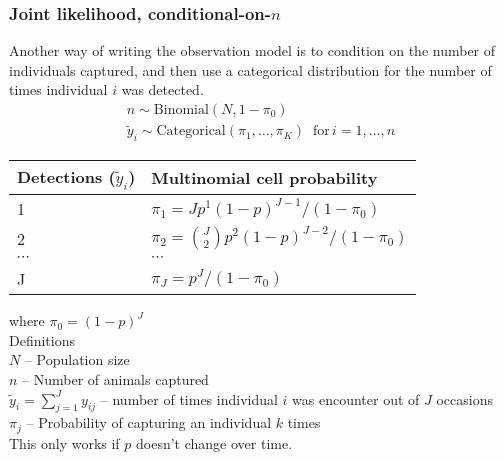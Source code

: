\documentclass[color=usenames,dvipsnames]{beamer}\usepackage[]{graphicx}\usepackage[]{color}
\begin{document}
\begin{frame}
  \frametitle{Joint likelihood, conditional-on-$n$}
  \small
  Another way of writing the observation model is to condition on the
  number of individuals captured, and then use a
  categorical distribution for the number of times individual $i$
  was detected. 
  \begin{gather*}
    n \sim \mathrm{Binomial}\left(N, 1-\pi_0\right)                               \\
    \tilde{y}_i \sim \mathrm{Categorical}(\pi_1, \dots, \pi_K) \;\;
    \mathrm{for}\, i=1,\dots,n 
  \end{gather*}
  \pause
  \centering
  \vspace{6pt}
  \begin{tabular}{ll}
    \hline
    Detections ($\tilde{y}_i$) & Multinomial cell probability                     \\
    \hline
      1                        & $\pi_1 = Jp^{1}(1-p)^{J-1}/(1-\pi_0)$            \\
      2                        & $\pi_2 = {J\choose 2}p^{2}(1-p)^{J-2}/(1-\pi_0)$ \\
      $\cdots$                 & $\cdots$                                         \\
      J                        & $\pi_J = p^{J}/(1-\pi_0)$                        \\
      \hline
  \end{tabular}
  \flushleft
  \vspace{-6pt}
  where $\pi_0=(1-p)^J$ \\ 
  \pause
  \vfill
  Definitions \\
  \scriptsize
  $N$ -- Population size                                                          \\
  $n$ -- Number of animals captured                                               \\
  $\tilde{y}_i=\sum_{j=1}^J y_{ij}$ -- number of times individual $i$ was encounter out of $J$
  occasions                                                                       \\
  $\pi_j$ -- Probability of capturing an individual $k$ times \\
  \pause
  \vfill
  This only works if $p$ doesn't change over time. 
\end{frame}
\end{document}
